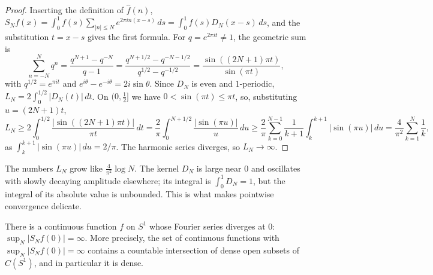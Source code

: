 \begin{proof}
Inserting the definition of $\hat f(n)$, $S_Nf(x) = \int_0^1f(s)\sum_{|n| \leq N}e^{2\pi in(x - s)}\,ds = \int_0^1f(s)D_N(x - s)\,ds$, and the substitution $t = x - s$ gives the first formula. For
$q = e^{2\pi it} \neq 1$, the geometric sum is
\[
\sum_{n=-N}^Nq^n = \frac{q^{N+1} - q^{-N}}{q - 1} = \frac{q^{N + 1/2} - q^{-N - 1/2}}{q^{1/2} - q^{-1/2}} = \frac{\sin((2N + 1)\pi t)}{\sin(\pi t)},
\]
with $q^{1/2} = e^{\pi it}$ and $e^{i\theta} - e^{-i\theta} = 2i\sin\theta$. Since $D_N$ is even and $1$-periodic, $L_N = 2\int_0^{1/2}|D_N(t)|\,dt$. On $(0, \frac12]$ we have $0 < \sin(\pi t) \leq \pi t$, so,
substituting $u = (2N + 1)t$,
\[
L_N \geq 2\int_0^{1/2}\frac{|\sin((2N + 1)\pi t)|}{\pi t}\,dt = \frac2\pi\int_0^{N + 1/2}\frac{|\sin(\pi u)|}{u}\,du \geq \frac2\pi\sum_{k=0}^{N-1}\frac{1}{k + 1}\int_k^{k+1}|\sin(\pi u)|\,du
= \frac{4}{\pi^2}\sum_{k=1}^N\frac1k,
\]
as $\int_k^{k+1}|\sin(\pi u)|\,du = 2/\pi$. The harmonic series diverges, so $L_N \to \infty$.
\end{proof}

The numbers $L_N$ grow like $\frac{4}{\pi^2}\log N$. The kernel $D_N$ is large near $0$ and oscillates with slowly decaying amplitude elsewhere; its integral is $\int_0^1D_N = 1$, but the integral of its
absolute value is unbounded. This is what makes pointwise convergence delicate.

\begin{theorem}\label{functional-analysis:theorem-divergent-fourier}
There is a continuous function $f$ on $S^1$ whose Fourier series diverges at $0$: $\sup_N|S_Nf(0)| = \infty$. More precisely, the set of continuous functions with $\sup_N|S_Nf(0)| = \infty$
contains a countable intersection of dense open subsets of $C(S^1)$, and in particular it is dense.
\end{theorem}

